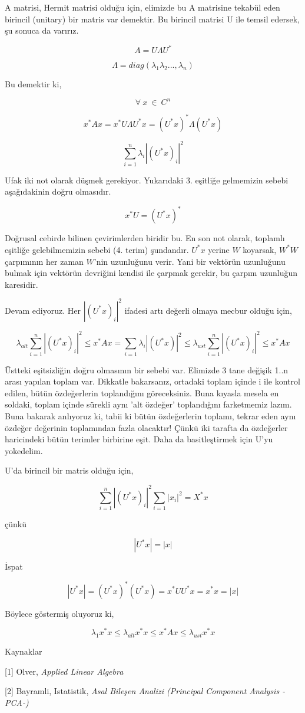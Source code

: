 \documentclass[12pt,fleqn]{article}\usepackage{../../common}
\begin{document}
A matrisi, Hermit matrisi olduğu için, elimizde bu A matrisine tekabül eden
birincil (unitary) bir matris var demektir. Bu birincil matrisi U ile
temsil edersek, şu sonuca da varırız.

$$ A = U \Lambda U^* $$

$$ \Lambda = diag(\lambda_1\lambda_2...,\lambda_n) $$

Bu demektir ki, 

$$ \forall \ x \ \in \ C^n  $$

$$ x^*Ax = x^*U\Lambda U^*x = (U^*x)^*\Lambda(U^*x) $$

$$ \sum_{i=1}^n \lambda_i |(U^*x)_i|^2 $$

Ufak iki not olarak düşmek gerekiyor. Yukarıdaki 3. eşitliğe gelmemizin
sebebi aşağıdakinin doğru olmasıdır.

$$ x^*U = (U^*x)^* $$

Doğrusal cebirde bilinen çevirimlerden biridir bu. En son not olarak,
toplamlı eşitliğe gelebilmemizin sebebi (4. terim) şundandır. $U^*x$ yerine
$W$ koyarsak, $W^*W$ çarpımının her zaman $W$'nin uzunluğunu verir. Yani
bir vektörün uzunluğunu bulmak için vektörün devriğini kendisi ile çarpmak
gerekir, bu çarpım uzunluğun karesidir.

Devam ediyoruz. Her $|(U^*x)_i|^2$ ifadesi artı değerli olmaya mecbur
olduğu için,

$$ \lambda_{alt}\sum_{i=1}^n |(U^*x)_i|^2 \le x^*Ax = 
\sum_{i=1}\lambda_i |(U^*x)|^2 \le
\lambda_{ust}\sum_{i=1}^n |(U^*x)_i|^2 \le x^*Ax 
 $$

Üstteki eşitsizliğin doğru olmasının bir sebebi var. Elimizde 3 tane
değişik 1..n arası yapılan toplam var. Dikkatle bakarsanız, ortadaki
toplam içinde i ile kontrol edilen, bütün özdeğerlerin toplandığını
göreceksiniz. Buna kıyasla mesela en soldaki, toplam içinde sürekli aynı
'alt özdeğer' toplandığını farketmemiz lazım. Buna bakarak anlıyoruz ki,
tabii ki bütün özdeğerlerin toplamı, tekrar eden aynı özdeğer değerinin
toplamından fazla olacaktır! Çünkü iki tarafta da özdeğerler haricindeki
bütün terimler birbirine eşit. Daha da basitleştirmek için U'yu yokedelim.

U'da birincil bir matris olduğu için, 

$$ \sum_{i=1}^n |(U^*x)_i|^2 \sum_{i=1} |x_i|^2 = X^*x  $$

çünkü

$$ |U^*x| = |x|$$

İspat

$$ |U^*x| = (U^*x)^*(U^*x) = x^*UU^*x = x^*x = |x| $$

Böylece göstermiş oluyoruz ki, 

$$ \lambda_1x^*x \le \lambda_{alt}x^*x \le x^*Ax \le \lambda_{ust}x^*x $$ 

Kaynaklar

[1] Olver, {\em Applied Linear Algebra}

[2] Bayramli, Istatistik, {\em Asal Bileşen Analizi (Principal Component Analysis -PCA-)}
\end{document}
